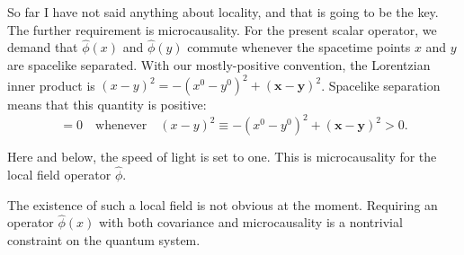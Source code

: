 So far I have not said anything about locality, and that is going to be the key.
The further requirement is microcausality.
For the present scalar operator, we demand that $\hat\phi(x)$ and $\hat\phi(y)$
commute
whenever the spacetime points $x$ and $y$ are spacelike separated.
With our mostly-positive convention, the Lorentzian inner product is
$(x-y)^2=-(x^0-y^0)^2+(\mathbf x-\mathbf y)^2$.
Spacelike separation means that this quantity is positive:
\begin{equation}
  [\hat\phi(x),\hat\phi(y)]=0
  \quad\text{whenever}\quad
  (x-y)^2\equiv-(x^0-y^0)^2+(\mathbf x-\mathbf y)^2>0.
  \label{eq:253a-microcausality}
\end{equation}

Here and below, the speed of light is set to one.
This is microcausality for the local field operator $\hat\phi$.

The existence of such a local field is not obvious at the moment. Requiring an
operator $\hat\phi(x)$ with both covariance and microcausality is a nontrivial
constraint on the quantum system.


